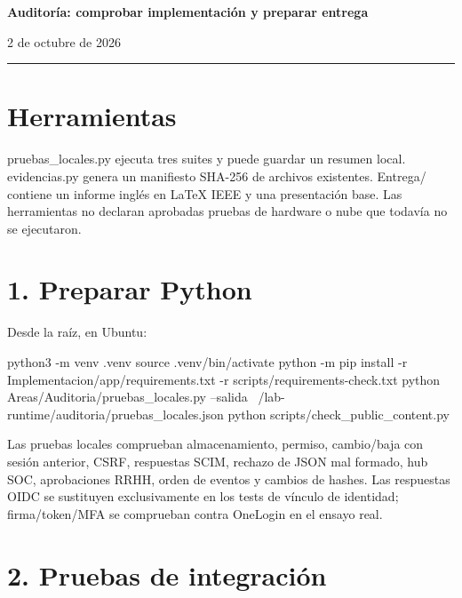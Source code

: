 \documentclass[12pt,a4paper]{article}
\begin{document}
{\LARGE\bfseries Auditoría: comprobar implementación y preparar entrega\par}\vspace{6pt}
2 de octubre de 2026\par\hrule\vspace{10pt}
\section*{Herramientas}
\textnormal{pruebas\_\allowbreak{}locales.py} ejecuta tres suites y puede guardar un resumen local. \textnormal{evidencias.py} genera un manifiesto SHA-256 de archivos existentes. \textnormal{Entrega/\allowbreak{}} contiene un informe inglés en LaTeX IEEE y una presentación base. Las herramientas no declaran aprobadas pruebas de hardware o nube que todavía no se ejecutaron.\par
{}\section*{1. Preparar Python}
Desde la raíz, en Ubuntu:\par
{}
\begin{Comandos}
python3 -m venv .venv
source .venv/bin/activate
python -m pip install -r Implementacion/app/requirements.txt -r scripts/requirements-check.txt
python Areas/Auditoria/pruebas_locales.py --salida ~/lab-runtime/auditoria/pruebas_locales.json
python scripts/check_public_content.py
\end{Comandos}
Las pruebas locales comprueban almacenamiento, permiso, cambio/baja con sesión anterior, CSRF, respuestas SCIM, rechazo de JSON mal formado, hub SOC, aprobaciones RRHH, orden de eventos y cambios de hashes. Las respuestas OIDC se sustituyen exclusivamente en los tests de vínculo de identidad; firma/token/MFA se comprueban contra OneLogin en el ensayo real.\par
{}\section*{2. Pruebas de integración}
\end{document}
